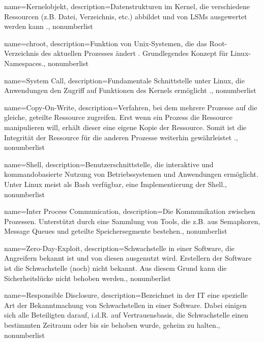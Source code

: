 {%
  name={Kernelobjekt},
  description={Datenstrukturen im Kernel, die verschiedene Ressourcen (z.B. Datei, Verzeichnis, etc.) abbildet und von LSMs ausgewertet werden kann \cite{kernelObjects}.},
  nonumberlist
}

{%
  name={chroot},
  description={Funktion von Unix-Systemen, die das Root-Verzeichnis des aktuellen Prozesses ändert \cite{chroot}. Grundlegendes Konzept für Linux-Namespaces.},
  nonumberlist
}

{%
  name={System Call},
  description={Fundamentale Schnittstelle unter Linux, die Anwendungen den Zugriff auf Funktionen des Kernels ermöglicht \cite{systemcall}.},
  nonumberlist
}

{%
  name={Copy-On-Write},
  description={Verfahren, bei dem mehrere Prozesse auf die gleiche, geteilte Ressource zugreifen. Erst wenn ein Prozess die Ressource manipulieren will, erhält dieser eine eigene Kopie der Ressource. Somit ist die Integrität der Ressource für die anderen Prozesse weiterhin gewährleistet \cite{dockerImagesAndContainers}.},
  nonumberlist
}

{%
  name={Shell},
  description={Benutzerschnittstelle, die interaktive und kommandobasierte Nutzung von Betriebssystemen und Anwendungen ermöglicht. Unter Linux meist als Bash verfügbar, eine Implementierung der Shell.},
  nonumberlist
}

{%
  name={Inter Process Communication},
  description={Die Kommunikation zwischen Prozessen. Unterstützt durch eine Sammlung von Tools, die z.B. aus Semaphoren, Message Queues und geteilte Speichersegmente bestehen.},
  nonumberlist
}


{%
  name={Zero-Day-Exploit},
  description={Schwachstelle in einer Software, die Angreifern bekannt ist und von diesen ausgenutzt wird. Erstellern der Software ist die Schwachstelle (noch) nicht bekannt. Aus diesem Grund kann die Sicherheitslücke nicht behoben werden.},
  nonumberlist
}

{%
  name={Responsible Disclosure},
  description={Bezeichnet in der IT eine spezielle Art der Bekanntmachung von Schwachstellen in einer Software. Dabei einigen sich alle Beteiligten darauf, i.d.R. auf Vertrauensbasis, die Schwachstelle einen bestimmten Zeitraum oder bis sie behoben wurde, geheim zu halten.},
  nonumberlist
}

